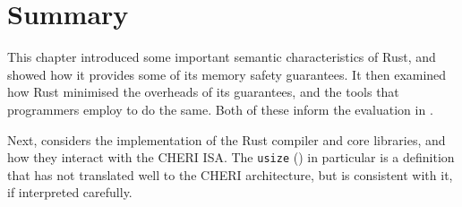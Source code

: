 \documentclass[dissertation.tex]{subfiles}
\begin{document}
\section{Summary}

This chapter introduced some important semantic characteristics of Rust,
and showed how it provides some of its memory safety guarantees.
It then examined how Rust minimised the overheads of its guarantees, and
the tools that programmers employ to do the same.
Both of these inform the evaluation in .

Next,  considers the implementation of the Rust compiler
and core libraries, and how they interact with the CHERI ISA.
The \texttt{usize} () in particular is a definition
that has not translated well to the CHERI architecture, but is
consistent with it, if interpreted carefully.
\end{document}
